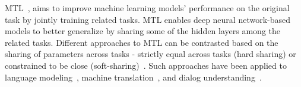 MTL~\cite{caruana1997multitask}, aims to improve machine learning models' performance on the original task by jointly training related tasks. 
MTL enables deep neural network-based models to better generalize by sharing some of the hidden layers among the related tasks. 
Different approaches to MTL can be contrasted based on the sharing of parameters across tasks - strictly equal across tasks (hard sharing) or constrained to be close (soft-sharing)~\cite{ruder2017an}.
Such approaches have been applied to language modeling~\cite{howard2018universal}, machine translation~\cite{dong2015multi}, and dialog understanding~\cite{rastogi2018multi}.
